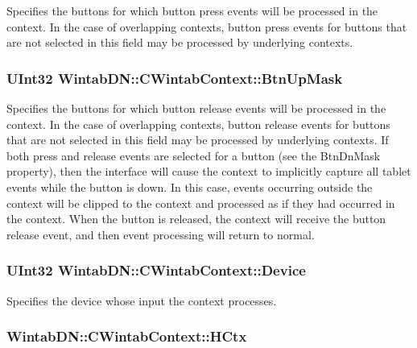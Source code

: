 Specifies the buttons for which button press events will be processed in the context. In the case of overlapping contexts, button press events for buttons that are not selected in this field may be processed by underlying contexts. 

\hypertarget{class_wintab_d_n_1_1_c_wintab_context_a042b96b3c968d2f06eaa8f8d055852a5}{
\subsubsection[{BtnUpMask}]{\setlength{\rightskip}{0pt plus 5cm}UInt32 WintabDN::CWintabContext::BtnUpMask}}
\label{class_wintab_d_n_1_1_c_wintab_context_a042b96b3c968d2f06eaa8f8d055852a5}


Specifies the buttons for which button release events will be processed in the context. In the case of overlapping contexts, button release events for buttons that are not selected in this field may be processed by underlying contexts. If both press and release events are selected for a button (see the BtnDnMask property), then the interface will cause the context to implicitly capture all tablet events while the button is down. In this case, events occurring outside the context will be clipped to the context and processed as if they had occurred in the context. When the button is released, the context will receive the button release event, and then event processing will return to normal. 

\hypertarget{class_wintab_d_n_1_1_c_wintab_context_add1f6cc256a7a0aac3cd6ebdeaf8168d}{
\subsubsection[{Device}]{\setlength{\rightskip}{0pt plus 5cm}UInt32 WintabDN::CWintabContext::Device}}
\label{class_wintab_d_n_1_1_c_wintab_context_add1f6cc256a7a0aac3cd6ebdeaf8168d}


Specifies the device whose input the context processes. 

\hypertarget{class_wintab_d_n_1_1_c_wintab_context_a94553614e6d802faa0133eee5fba4139}{
\subsubsection[{HCtx}]{ WintabDN::CWintabContext::HCtx}}
\label{class_wintab_d_n_1_1_c_wintab_context_a94553614e6d802faa0133eee5fba4139}


